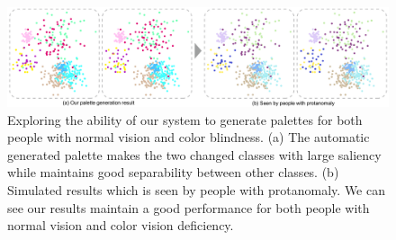 \documentclass[review,onecolumn]{vgtc}                %
\begin{document}
\begin{figure}[ht]
\centering
\includegraphics[width=0.96\linewidth]{blindness.pdf}
\caption{Exploring the ability of our system to generate palettes for both people with normal vision and color blindness. (a) The automatic generated palette makes the two changed classes with large saliency while maintains good separability between other classes. (b) Simulated results which is seen by people with protanomaly. We can see our results maintain a good performance for both people with normal vision and color vision deficiency.}
\vspace*{-3mm}
\label{fig:blindness}
\end{figure}



\end{document}
